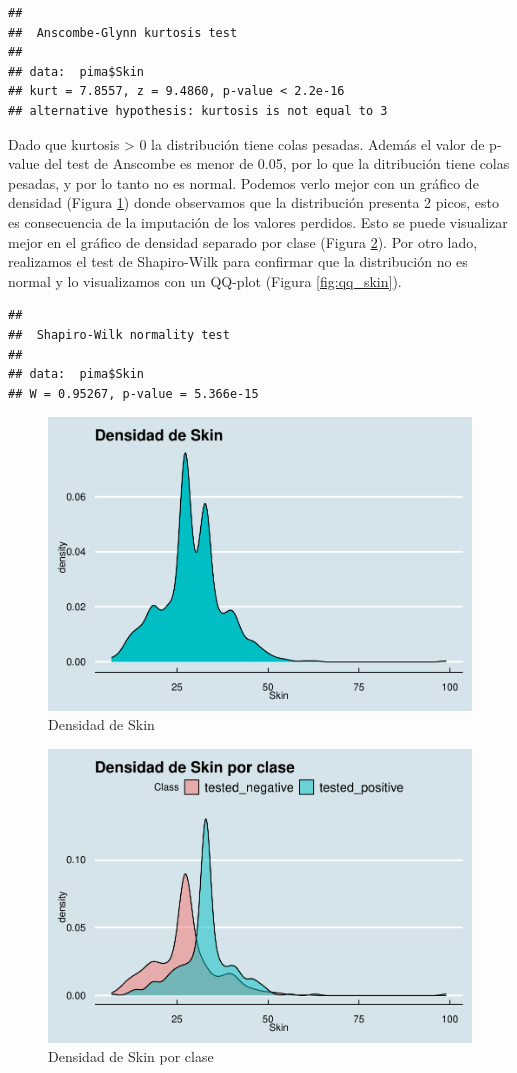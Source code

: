 \documentclass[
]{article}
\begin{document}
\begin{verbatim}
## 
##  Anscombe-Glynn kurtosis test
## 
## data:  pima$Skin
## kurt = 7.8557, z = 9.4860, p-value < 2.2e-16
## alternative hypothesis: kurtosis is not equal to 3
\end{verbatim}

Dado que kurtosis \textgreater{} 0 la distribución tiene colas pesadas.
Además el valor de p-value del test de Anscombe es menor de 0.05, por lo
que la ditribución tiene colas pesadas, y por lo tanto no es normal.
Podemos verlo mejor con un gráfico de densidad (Figura
\ref{fig:dens_skin}) donde observamos que la distribución presenta 2
picos, esto es consecuencia de la imputación de los valores perdidos.
Esto se puede visualizar mejor en el gráfico de densidad separado por
clase (Figura \ref{fig:dens_skin_class}). Por otro lado, realizamos el
test de Shapiro-Wilk para confirmar que la distribución no es normal y
lo visualizamos con un QQ-plot (Figura \ref{fig:qq_skin}).

\begin{verbatim}
## 
##  Shapiro-Wilk normality test
## 
## data:  pima$Skin
## W = 0.95267, p-value = 5.366e-15
\end{verbatim}

\begin{figure}

{\centering \includegraphics[width=0.5\linewidth]{pima-clasificacion_files/figure-latex/dens_skin-1} 

}

\caption{Densidad de Skin}\label{fig:dens_skin}
\end{figure}

\begin{figure}

{\centering \includegraphics[width=0.5\linewidth]{pima-clasificacion_files/figure-latex/dens_skin_class-1} 

}

\caption{Densidad de Skin por clase}\label{fig:dens_skin_class}
\end{figure}
\end{document}
